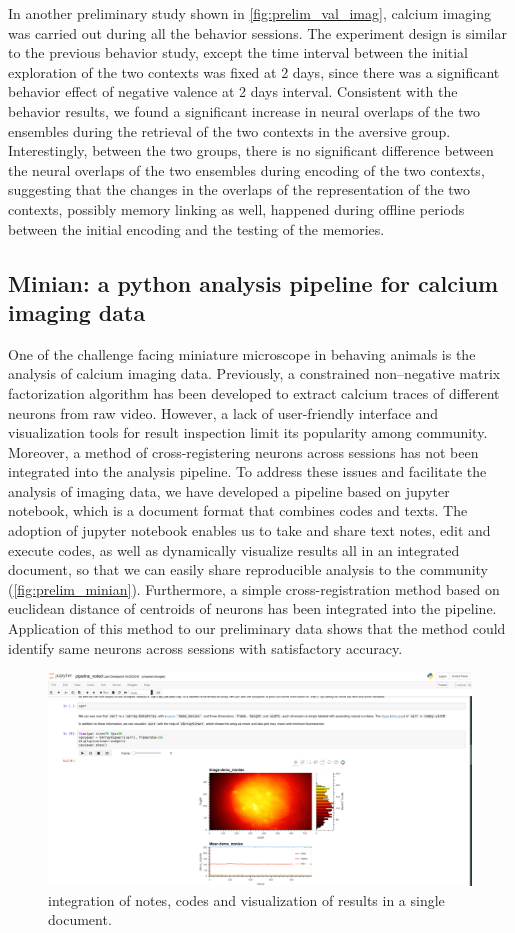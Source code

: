 \documentclass[master.tex]{subfiles}
\begin{document}
In another preliminary study shown in \autoref{fig:prelim_val_imag}, calcium
imaging was carried out during all the behavior sessions. The experiment design
is similar to the previous behavior study, except the time interval between the
initial exploration of the two contexts was fixed at 2 days, since there was a
significant behavior effect of negative valence at 2 days interval. Consistent
with the behavior results, we found a significant increase in neural overlaps of
the two ensembles during the retrieval of the two contexts in the aversive
group. Interestingly, between the two groups, there is no significant difference
between the neural overlaps of the two ensembles during encoding of the two
contexts, suggesting that the changes in the overlaps of the representation of
the two contexts, possibly memory linking as well, happened during offline
periods between the initial encoding and the testing of the memories.

\subsection*{Minian: a python analysis pipeline for calcium imaging data}

One of the challenge facing miniature microscope in behaving animals is the
analysis of calcium imaging data. Previously, a constrained non--negative matrix
factorization algorithm has been developed to extract calcium traces of
different neurons from raw video. However, a lack of user-friendly interface and
visualization tools for result inspection limit its popularity among community.
Moreover, a method of cross-registering neurons across sessions has not been
integrated into the analysis pipeline. To address these issues and facilitate
the analysis of imaging data, we have developed a pipeline based on jupyter
notebook, which is a document format that combines codes and texts. The adoption
of jupyter notebook enables us to take and share text notes, edit and execute
codes, as well as dynamically visualize results all in an integrated document,
so that we can easily share reproducible analysis to the community
(\autoref{fig:prelim_minian}). Furthermore, a simple cross-registration method
based on euclidean distance of centroids of neurons has been integrated into the
pipeline. Application of this method to our preliminary data shows that the
method could identify same neurons across sessions with satisfactory accuracy.

\begin{figure}[h]
  \centering \includegraphics[scale = .135]{Figures/minian.png}
  \caption{\footnotesize integration of notes, codes and visualization of
    results in a single document.}
  \label{fig:prelim_minian}
\end{figure}
\end{document}
